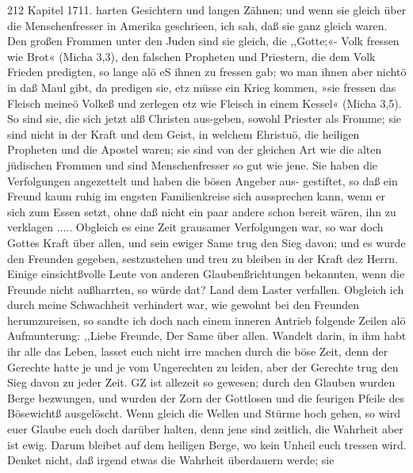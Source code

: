 212 Kapitel 1711.
harten Gesichtern und langen Zähnen; und wenn sie gleich über
die Menschenfresser in Amerika geschrieen, ich sah, daß sie ganz
gleich waren. Den großen Frommen unter den Juden sind sie
gleich, die ,,Gotte;«- Volk fressen wie Brot« (Micha 3,3), den
falschen Propheten und Priestern, die dem Volk Frieden predigten,
so lange alö eS ihnen zu fressen gab; wo man ihnen aber
nichtö in daß Maul gibt, da predigen sie, etz müsse ein Krieg
kommen, »sie fressen das Fleisch meineö Volkeß und zerlegen etz
wie Fleisch in einem Kessel« (Micha 3,5).
So sind sie, die sich jetzt alß Christen aus-geben, sowohl
Priester als Fromme; sie sind nicht in der Kraft und dem Geist,
in welchem Ehristuö, die heiligen Propheten und die Apostel
waren; sie sind von der gleichen Art wie die alten jüdischen
Frommen und sind Menschenfresser so gut wie jene. Sie haben
die Verfolgungen angezettelt und haben die bösen Angeber aus-
gestiftet, so daß ein Freund kaum ruhig im engsten Familienkreise
sich aussprechen kann, wenn er sich zum Essen setzt, ohne daß
nicht ein paar andere schon bereit wären, ihn zu verklagen .....
Obgleich es eine Zeit grausamer Verfolgungen war, so war
doch Gottes Kraft über allen, und sein ewiger Same trug den Sieg
davon; und es wurde den Freunden gegeben, sestzustehen und treu
zu bleiben in der Kraft dez Herrn. Einige einsichtßvolle Leute
von anderen Glaubenßrichtungen bekannten, wenn die Freunde
nicht außharrten, so würde dat? Land dem Laster verfallen.
Obgleich ich durch meine Schwachheit verhindert war, wie
gewohnt bei den Freunden herumzureisen, so sandte ich doch nach
einem inneren Antrieb folgende Zeilen alö Aufmunterung:
,,Liebe Freunde,
Der Same über allen. Wandelt darin, in ihm habt ihr
alle das Leben, lasset euch nicht irre machen durch die böse Zeit,
denn der Gerechte hatte je und je vom Ungerechten zu leiden,
aber der Gerechte trug den Sieg davon zu jeder Zeit. GZ ist
allezeit so gewesen; durch den Glauben wurden Berge bezwungen,
und wurden der Zorn der Gottlosen und die feurigen Pfeile des
Bösewichtß ausgelöscht. Wenn gleich die Wellen und Stürme
hoch gehen, so wird euer Glaube euch doch darüber halten, denn
jene sind zeitlich, die Wahrheit aber ist ewig. Darum bleibet auf
dem heiligen Berge, wo kein Unheil euch tressen wird. Denket
nicht, daß irgend etwas die Wahrheit überdauern werde; sie


